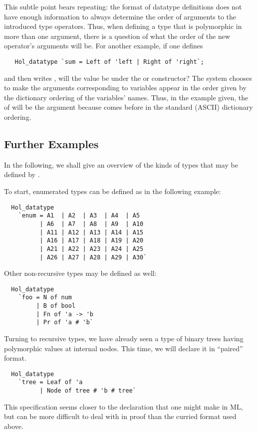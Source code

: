 This subtle point bears repeating: the format of datatype definitions
does not have enough information to always determine the order of
arguments to the introduced type operators. Thus, when defining a type
that is polymorphic in more than one argument, there is a question of
what the order of the new operator's arguments will be.  For another
example, if one defines
%
\begin{hol}
\begin{verbatim}
   Hol_datatype `sum = Left of 'left | Right of 'right`;
\end{verbatim}
\end{hol}
%
and then writes , will the  value be under the
 or  constructor?  The system chooses to make the
arguments corresponding to variables appear in the order given by the
dictionary ordering of the variables' names.  Thus, in the example
given, the  of  will be the  argument
because  comes before  in the standard (ASCII)
dictionary ordering.

\subsection{Further Examples}

 In the following, we shall give an overview of the kinds of types that
 may be defined by .

 To start, enumerated types can be defined as in the following example:
\begin{hol}
\begin{verbatim}
  Hol_datatype
    `enum = A1  | A2  | A3  | A4  | A5
          | A6  | A7  | A8  | A9  | A10
          | A11 | A12 | A13 | A14 | A15
          | A16 | A17 | A18 | A19 | A20
          | A21 | A22 | A23 | A24 | A25
          | A26 | A27 | A28 | A29 | A30`
\end{verbatim}
\end{hol}
%
Other non-recursive types may be defined as well:
\begin{hol}
\begin{verbatim}
  Hol_datatype
    `foo = N of num
         | B of bool
         | Fn of 'a -> 'b
         | Pr of 'a # 'b`
\end{verbatim}
\end{hol}
%
Turning to recursive types, we have already seen a type of binary
trees having polymorphic values at internal nodes. This time, we will
declare it in ``paired'' format.
\begin{hol}
\begin{verbatim}
  Hol_datatype
    `tree = Leaf of 'a
          | Node of tree # 'b # tree`
\end{verbatim}
\end{hol}
%
This specification seems closer to the declaration that one might make
in ML, but can be more difficult to deal with in proof than the curried format
used above.

